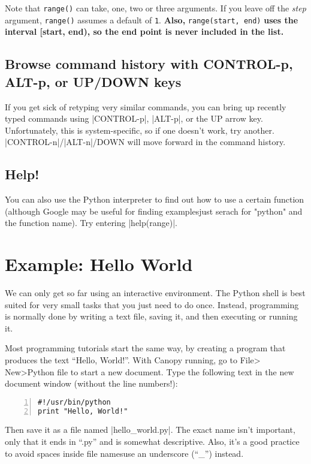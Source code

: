 \documentclass{article}
\begin{document}
Note that \texttt{range()} can take, one, two or three arguments.  If you leave
off the \textit{step} argument, \texttt{range()} assumes a default of
\texttt{1}.  \textbf{Also,} \texttt{range(start, end)} \textbf{uses the interval
[start, end), so the end point is never included in the list.}

\subsection{Browse command history with CONTROL-p, ALT-p, or UP/DOWN keys}
If you get sick of retyping very similar commands, you can bring up recently
typed commands using |CONTROL-p|, |ALT-p|, or the UP arrow key.  Unfortunately,
this is system-specific, so if one doesn't work, try another.  |CONTROL-n|/|ALT-n|/DOWN will move
forward in the command history.

\subsection{Help!}
You can also use the Python interpreter to find out how to use a certain function (although Google may be useful for finding examples\textemdash just serach for "python" and the function name).  Try entering |help(range)|.

\section{Example: Hello World}
We can only get so far using an interactive environment.  The Python shell is
best suited for very small tasks that you just need to do once.  Instead,
programming is normally done by writing a text file, saving it, and then
executing or running it.

Most programming tutorials start the same way, by creating a program that
produces the text ``Hello, World!''.  With Canopy running, go to File\textgreater
New\textgreater Python file to start a new document.  Type the following text in the new document
window (without the line numbers!):

\begin{Verbatim}[numbers=left]
#!/usr/bin/python
print "Hello, World!"
\end{Verbatim}

Then save it as a file named |hello_world.py|.  The exact name isn't important,
only that it ends in ``.py'' and is somewhat descriptive.  Also, it's a good practice to
avoid spaces inside file names\textemdash use an underscore (``\_'') instead.
\end{document}
